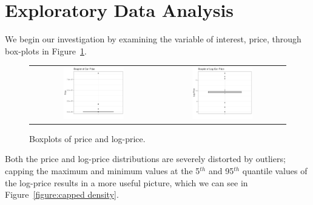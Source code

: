 \documentclass[a4paper, 10pt, titlepage]{article}
\begin{document}
\section{Exploratory Data Analysis}
We begin our investigation by examining the variable of interest, price, through box-plots in Figure~\ref{figure:uncapped boxplot}.

\begin{figure}[!ht]
	\centering
	   \begin{tabular}{cc}
	      \includegraphics[width = 0.5\textwidth]{images/price.png}  & \includegraphics[width = 0.5\textwidth]{images/logprice.png} 
	   \end{tabular}
	\caption{Boxplots of price and log-price.}
	\label{figure:uncapped boxplot}
\end{figure}

Both the price and log-price distributions are severely distorted by outliers; capping the maximum and minimum values at the 5$^{th}$ and 95$^{th}$ quantile values of the log-price results in a more useful picture, which we can see in Figure~\ref{figure:capped density}.
\end{document}

